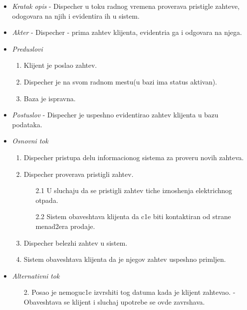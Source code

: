\documentclass[10 pt]{article}
\begin{document}
		\begin{itemize}
			\item\textit{Kratak opis} - Dispecher u toku radnog vremena proverava pristigle zahteve, odogovara na njih i evidentira ih u sistem.
			
			\item\textit{Akter} - Dispecher - prima zahtev klijenta, evidentria ga i odgovara na njega.
			
			\item\textit{Preduslovi}
				\begin{enumerate}
					\item Klijent je poslao zahtev.
					\item Dispecher je na svom radnom mestu(u bazi ima status aktivan).
					\item Baza je ispravna.
				\end{enumerate} 
			
			\item\textit{Postuslov} - Dispecher je uspeshno evidentirao zahtev klijenta u bazu podataka.
			
			\item\textit{Osnovni tok}
				\begin{enumerate}
					\item Dispecher pristupa delu informacionog sistema za proveru novih zahteva.
					\item Dispecher proverava pristigli zahtev.
						\begin{enumerate}
							\item[2.1] U sluchaju da se pristigli zahtev tiche iznoshenja elektrichnog otpada.
							\item[2.2] Sistem obaveshtava klijenta da c1e biti kontaktiran od strane menad2era prodaje.
						\end{enumerate}
					\item Dispecher belezhi zahtev u sistem.
					\item Sistem obaveshtava klijenta da je njegov zahtev uspeshno primljen.
				\end{enumerate}
	
			\item\textit{Alternativni tok}
				\begin{enumerate}
					\item [2.] Posao je nemoguc1e izvrshiti tog datuma kada je klijent zahtevao. - Obaveshtava se klijent i sluchaj upotrebe se ovde zavrshava.
				\end{enumerate}
		\end{itemize}
	
\end{document}
